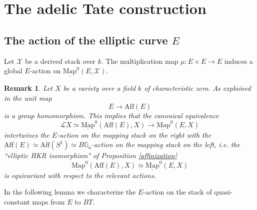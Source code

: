 \documentclass[11pt,letterpaper]{amsart}
\newtheorem{remark}[dummy]{Remark}
\newcommand{\bG}{\mathbb{G}}
\newcommand{\cL}{\mathcal{L}}
\newcommand{\cX}{\mathcal{X}}
\newcommand{\Mapo}[2]{\underline{\mathrm{Map}}^{0}\left (#1,#2\right )}
\newcommand{\Aff}[1]{\mathrm{Aff}(#1)}
\begin{document}
\section{The adelic Tate construction}\label{section:Tate}

\subsection{The action of the elliptic curve $E$} 
Let $\cX$ be a derived stack over $k$. The multiplication map $\mu:E\times E\to E$ induces a global $E$-action on $\Mapo{E}{\cX}$.

\begin{remark}
Let $X$ be a variety over a field $k$ of characteristic zero.
As explained in \cite{BZNLoopConn} the unit map
$$E\to\Aff{E}$$
is a group homomorphism. This implies that the canonical equivalence
$$\cL X\simeq\Mapo{\Aff{E}}{X}\to\Mapo{E}{X}$$
intertwines the $E$-action on the mapping stack on the right with the $\Aff{E}\simeq\Aff{S^1}\simeq B\bG_a$-action on the mapping stack on the left, i.e. the ``elliptic HKR isomorphism" of Proposition \ref{affinization}
\[
\Mapo{\Aff{E}}{X}\simeq\Mapo{E}{X}
\]
is equivariant with respect to the relevant actions.
\end{remark}

In the following lemma we characterize the $E$-action on the stack of quasi-constant maps from $E$ to $BT$.
\end{document}
